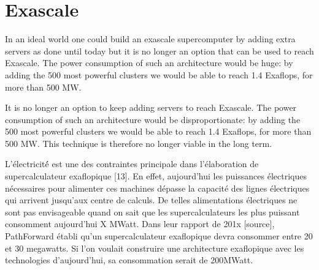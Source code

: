 \section{Exascale}\label{sec:exascale}



In an ideal world one could build an exascale supercomputer by adding extra servers as done until today but it is no longer an option that can be used to reach Exascale. The power consumption of such an architecture would be huge: by adding the 500 most powerful clusters we would be able to reach 1.4 Exaflops, for more than 500 MW.

It is no longer an option to keep adding servers to reach Exascale. The power consumption of such an architecture would be disproportionate: by adding the 500 most powerful clusters we would be able to reach 1.4 Exaflops, for more than 500 MW. This technique is therefore no longer viable in the long term.

L’électricité́ est une des contraintes principale dans l’élaboration de supercalculateur exaflopique [13]. En effet, aujourd’hui les puissances électriques nécessaires pour alimenter ces machines dépasse la capacité des lignes électriques qui arrivent jusqu’aux centre de calculs. De telles alimentations électriques ne sont pas envisageable quand on sait que les supercalculateurs les plus puissant consomment aujourd’hui X MWatt. Dans leur rapport de 201x [source], PathForward établi qu’un supercalculateur exaflopique devra consommer entre 20 et 30 megawatts. Si l’on voulait construire une architecture exaflopique avec les technologies d’aujourd’hui, sa consommation serait de 200MWatt.
 


